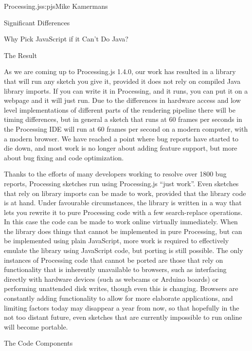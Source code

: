 \begin{aosachapter}{Processing.js}{s:pjs}{Mike Kamermans}
\begin{aosasect1}{Significant Differences}
\begin{aosasect2}{Why Pick JavaScript if it Can't Do Java?}
\end{aosasect2}

\begin{aosasect2}{The Result}

As we are coming up to Processing.js 1.4.0, our work has resulted in a
library that will run any sketch you give it, provided it does not
rely on compiled Java library imports. If you can write it in
Processing, and it runs, you can put it on a webpage and it will just
run. Due to the differences in hardware access and low level
implementations of different parts of the rendering pipeline there
will be timing differences, but in general a sketch that runs at 60
frames per seconds in the Processing IDE will run at 60 frames per
second on a modern computer, with a modern browser. We have reached a
point where bug reports have started to die down, and most work is no
longer about adding feature support, but more about bug fixing and
code optimization.

Thanks to the efforts of many developers working to resolve over 1800
bug reports, Processing sketches run using Processing.js ``just
work''. Even sketches that rely on library imports can be made to work,
provided that the library code is at hand. Under favourable circumstances,
the library is written in a way that lets you rewrite it to pure
Processing code with a few search-replace operations. In this case the
code can be made to work online virtually immediately. When the
library does things that cannot be implemented in pure Processing, but
can be implemented using plain JavaScript, more work is required to
effectively emulate the library using JavaScript code, but porting is
still possible. The only instances of Processing code that cannot be
ported are those that rely on functionality that is inherently
unavailable to browsers, such as interfacing directly with hardware
devices (such as webcams or Arduino boards) or performing unattended
disk writes, though even this is changing. Browsers are constantly adding
functionality to allow for more elaborate applications, and limiting
factors today may disappear a year from now, so that hopefully in the not
too distant future, even sketches that are currently impossible to run
online will become portable.

\end{aosasect2}

\end{aosasect1}

\begin{aosasect1}{The Code Components}


\end{aosasect1}
\end{aosachapter}
